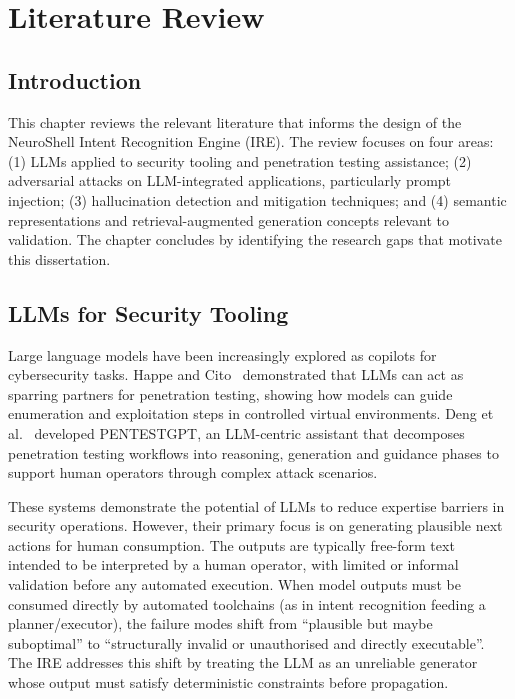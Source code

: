 \chapter{Literature Review}\label{ch:litreview}

\section{Introduction}\label{sec:lit-intro}

This chapter reviews the relevant literature that informs the design of the NeuroShell Intent Recognition Engine (IRE). The review focuses on four areas: (1) LLMs applied to security tooling and penetration testing assistance; (2) adversarial attacks on LLM-integrated applications, particularly prompt injection; (3) hallucination detection and mitigation techniques; and (4) semantic representations and retrieval-augmented generation concepts relevant to validation. The chapter concludes by identifying the research gaps that motivate this dissertation.

\section{LLMs for Security Tooling}\label{sec:lit-llm-security}

Large language models have been increasingly explored as copilots for cybersecurity tasks. Happe and Cito~\cite{happe2023pwned} demonstrated that LLMs can act as sparring partners for penetration testing, showing how models can guide enumeration and exploitation steps in controlled virtual environments. Deng et al.~\cite{deng2024pentestgpt} developed PENTESTGPT, an LLM-centric assistant that decomposes penetration testing workflows into reasoning, generation and guidance phases to support human operators through complex attack scenarios.

These systems demonstrate the potential of LLMs to reduce expertise barriers in security operations. However, their primary focus is on generating plausible next actions for human consumption. The outputs are typically free-form text intended to be interpreted by a human operator, with limited or informal validation before any automated execution. When model outputs must be consumed directly by automated toolchains (as in intent recognition feeding a planner/executor), the failure modes shift from ``plausible but maybe suboptimal'' to ``structurally invalid or unauthorised and directly executable''. The IRE addresses this shift by treating the LLM as an unreliable generator whose output must satisfy deterministic constraints before propagation.

